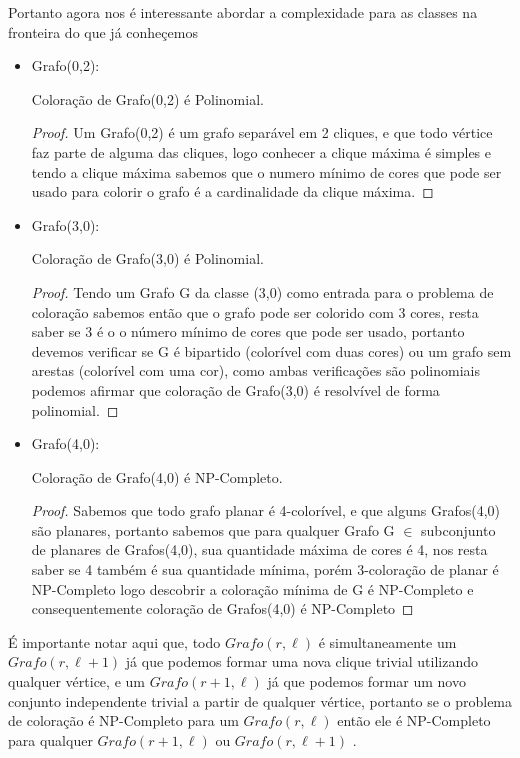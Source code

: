 Portanto agora nos é interessante abordar a complexidade para as classes na fronteira do que já conheçemos
\begin{itemize}
  \item Grafo(0,2):
     \begin{teorema}
        Coloração de Grafo(0,2) é Polinomial.
     \end{teorema}
     \begin{proof}
      Um Grafo(0,2) é um grafo separável em 2 cliques, e que todo vértice faz parte de alguma das cliques, logo conhecer a clique máxima é simples e tendo a clique máxima sabemos que o numero mínimo de cores que pode ser usado para colorir o grafo é a cardinalidade da clique máxima.
     \end{proof}
  \item Grafo(3,0):
     \begin{teorema}
        Coloração de Grafo(3,0) é Polinomial.
     \end{teorema}
     \begin{proof}
      Tendo um Grafo G da classe (3,0) como entrada para o problema de coloração sabemos então que o grafo pode ser colorido com 3 cores, resta saber se 3 é o o número mínimo de cores que pode ser usado, portanto devemos verificar se G é bipartido (colorível com duas cores) ou um grafo sem arestas (colorível com uma cor), como ambas verificações são polinomiais podemos afirmar que coloração de Grafo(3,0) é resolvível de forma polinomial.
     \end{proof}
  \item Grafo(4,0):
      \begin{teorema}
        Coloração de Grafo(4,0) é NP-Completo.
      \end{teorema}
      \begin{proof}
        Sabemos que todo grafo planar é 4-colorível, e que alguns Grafos(4,0) são planares, portanto sabemos que para qualquer Grafo G $\in$ subconjunto de planares de Grafos(4,0), sua quantidade máxima de cores é 4, nos resta saber se 4 também é sua quantidade mínima, porém 3-coloração de planar é NP-Completo logo descobrir a coloração mínima de G é NP-Completo e consequentemente coloração de Grafos(4,0) é NP-Completo
      \end{proof}
\end{itemize}

É importante notar aqui que, todo $Grafo(r,\ell)$ é simultaneamente um $Grafo(r,\ell+1)$ já que podemos formar uma nova clique trivial utilizando qualquer vértice, e um $Grafo(r+1,\ell)$ já que podemos formar um novo conjunto independente trivial a partir de qualquer vértice, portanto se o problema de coloração é NP-Completo para um $Grafo(r,\ell)$ então ele é NP-Completo para qualquer $Grafo(r+1,\ell)$ ou $Grafo(r,\ell+1)$ .

